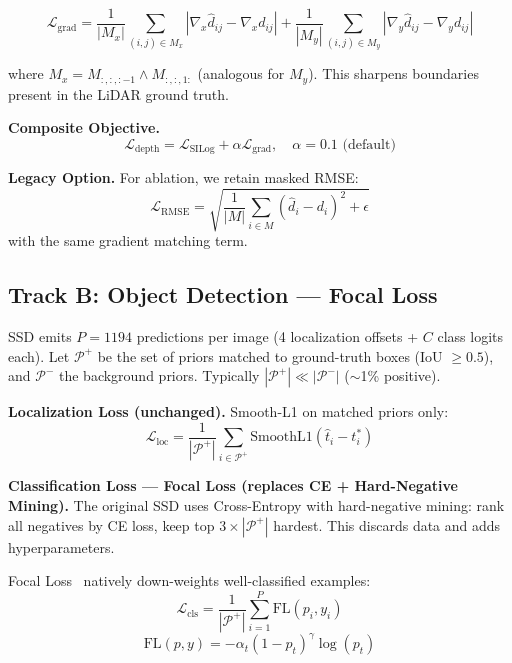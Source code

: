 \documentclass[10pt,conference]{IEEEtran}
\begin{document}
\begin{equation}
    \mathcal{L}_{\text{grad}} = \frac{1}{|M_x|} \sum_{(i,j) \in M_x} |\nabla_x \hat{d}_{ij} - \nabla_x d_{ij}| + \frac{1}{|M_y|} \sum_{(i,j) \in M_y} |\nabla_y \hat{d}_{ij} - \nabla_y d_{ij}|
\end{equation}

where $M_x = M_{:, :, :-1} \land M_{:, :, 1:}$ (analogous for $M_y$). This sharpens boundaries present in the LiDAR ground truth.

\textbf{Composite Objective.}
\begin{equation}
    \mathcal{L}_{\text{depth}} = \mathcal{L}_{\text{SILog}} + \alpha \mathcal{L}_{\text{grad}}, \quad \alpha = 0.1 \text{ (default)}
\end{equation}

\textbf{Legacy Option.} For ablation, we retain masked RMSE:
\begin{equation}
    \mathcal{L}_{\text{RMSE}} = \sqrt{ \frac{1}{|M|} \sum_{i \in M} (\hat{d}_i - d_i)^2 + \epsilon }
\end{equation}
with the same gradient matching term.

\subsection{Track B: Object Detection — Focal Loss}
\label{sec:det_loss}

SSD emits $P=1194$ predictions per image (4 localization offsets + $C$ class logits each). Let $\mathcal{P}^+$ be the set of priors matched to ground-truth boxes (IoU $\ge 0.5$), and $\mathcal{P}^-$ the background priors. Typically $|\mathcal{P}^+| \ll |\mathcal{P}^-|$ ($\sim$1\% positive).

\textbf{Localization Loss (unchanged).} Smooth-L1 on matched priors only:
\begin{equation}
    \mathcal{L}_{\text{loc}} = \frac{1}{|\mathcal{P}^+|} \sum_{i \in \mathcal{P}^+} \text{SmoothL1}(\hat{t}_i - t_i^*)
\end{equation}

\textbf{Classification Loss — Focal Loss (replaces CE + Hard-Negative Mining).} The original SSD uses Cross-Entropy with hard-negative mining: rank all negatives by CE loss, keep top $3 \times |\mathcal{P}^+|$ hardest. This discards data and adds hyperparameters.

Focal Loss~\cite{lin2017focal} natively down-weights well-classified examples:
\begin{equation}
    \mathcal{L}_{\text{cls}} = \frac{1}{|\mathcal{P}^+|} \sum_{i=1}^P \text{FL}(p_i, y_i)
\end{equation}
\begin{equation}
    \text{FL}(p, y) = -\alpha_t (1 - p_t)^\gamma \log(p_t)
\end{equation}
\end{document}

